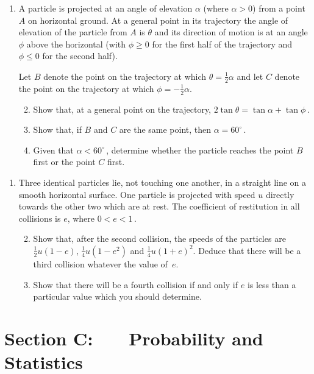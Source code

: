 \documentclass[a4, 11pt]{report}
\newlength{\qspace}
\newcounter{qnumber}
\newenvironment{question}%
 {\vspace{\qspace}
  \begin{enumerate}[\bfseries 1\quad][10]%
    \setcounter{enumi}{\value{qnumber}}%
    \item%
 }
{
  \end{enumerate}
  \filbreak
  \stepcounter{qnumber}
 }
\newenvironment{questionparts}[1][1]%
 {
  \begin{enumerate}[\bfseries (i)]%
    \setcounter{enumii}{#1}
    \addtocounter{enumii}{-1}
    \setlength{\itemsep}{5mm}
    \setlength{\parskip}{8pt}
 }
 {
  \end{enumerate}
 }
\def\le{\leqslant}
\def\ge{\geqslant}
\begin{document}
\begin{question}	
A particle is projected 
at an angle of elevation $\alpha$ (where $\alpha>0$) from a point
$A$ on horizontal ground.
At a general
point in its trajectory the angle of elevation of the particle
from $A$ is $\theta$ and 
its direction of motion is at  an angle $\phi$ above the horizontal
(with $\phi\ge0$ for the first half of the trajectory and $\phi\le0$
for the second half).

Let $B$ denote the point on the trajectory at which $\theta = \frac12 \alpha$
and let $C$ denote the point on the trajectory at which
 $\phi = -\frac12\alpha$.

\begin{questionparts}
\item Show that, at a general point on the trajectory,  
$2\tan\theta = \tan \alpha + \tan\phi\,$.
\item Show that, if $B$ and $C$ are the same point, then 
$ \alpha =  60^\circ\,$.
 \item Given that 
 $\alpha < 60^\circ\,$,
determine whether the particle reaches the  point $B$ first or the
point  $C$ first.
\end{questionparts}
\end{question}


\begin{question}
Three identical particles lie, not touching one another, in a straight line
on a smooth horizontal surface. One particle is projected with speed
$u$ directly towards the other two which are at rest. The coefficient of 
restitution in all collisions is $e$, where $0<e<1\,$.

\begin{questionparts}
\item Show that, after the second collision, the speeds of the particles are
$\frac12u(1-e)$, $\frac14u (1-e^2)$ and $\frac14u(1+e)^2$. 
Deduce that there will be a third  collision         
whatever the value of~$e$.
\item Show that there will be a fourth collision if and only if 
$e$ is less than a particular value which you should determine. 
\end{questionparts} 
\end{question}
	

	
	\newpage
\section*{Section C: \ \ \ Probability and Statistics}
\end{document}
